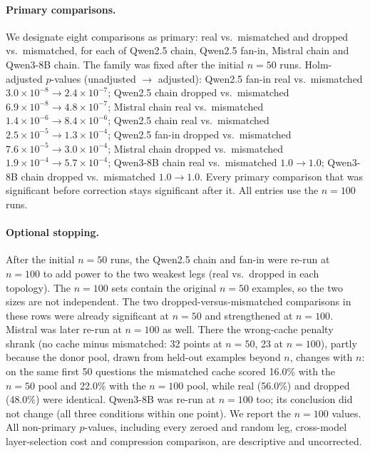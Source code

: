 \documentclass[11pt]{article}
\begin{document}
\paragraph{Primary comparisons.} We designate eight comparisons as primary:
real vs.\ mismatched and dropped vs.\ mismatched, for each of Qwen2.5 chain,
Qwen2.5 fan-in, Mistral chain and Qwen3-8B chain. The family was fixed after
the initial $n{=}50$ runs. Holm-adjusted $p$-values (unadjusted $\to$
adjusted): Qwen2.5 fan-in real vs.\ mismatched $3.0\times10^{-8}\to
2.4\times10^{-7}$; Qwen2.5 chain dropped vs.\ mismatched $6.9\times10^{-8}\to
4.8\times10^{-7}$; Mistral chain real vs.\ mismatched $1.4\times10^{-6}\to
8.4\times10^{-6}$; Qwen2.5 chain real vs.\ mismatched $2.5\times10^{-5}\to
1.3\times10^{-4}$; Qwen2.5 fan-in dropped vs.\ mismatched $7.6\times10^{-5}\to
3.0\times10^{-4}$; Mistral chain dropped vs.\ mismatched $1.9\times10^{-4}\to
5.7\times10^{-4}$; Qwen3-8B chain real vs.\ mismatched $1.0\to1.0$; Qwen3-8B
chain dropped vs.\ mismatched $1.0\to1.0$. Every primary comparison that was
significant before correction stays significant after it. All entries use the
$n{=}100$ runs.

\paragraph{Optional stopping.} After the initial $n{=}50$ runs, the Qwen2.5
chain and fan-in were re-run at $n{=}100$ to add power to the two weakest legs
(real vs.\ dropped in each topology). The $n{=}100$ sets contain the original
$n{=}50$ examples, so the two sizes are not independent. The two
dropped-versus-mismatched comparisons in these rows were already significant
at $n{=}50$ and strengthened at $n{=}100$. Mistral was later re-run at $n{=}100$
as well. There the wrong-cache penalty shrank (no cache minus mismatched: 32
points at $n{=}50$, 23 at $n{=}100$), partly because the donor pool, drawn from
held-out examples beyond $n$, changes with $n$: on the same first 50 questions
the mismatched cache scored 16.0\% with the $n{=}50$ pool and 22.0\% with the
$n{=}100$ pool, while real (56.0\%) and dropped (48.0\%) were identical.
Qwen3-8B was re-run at $n{=}100$ too; its conclusion did not change (all three
conditions within one point). We report the $n{=}100$ values. All non-primary
$p$-values,
including every zeroed and random leg, cross-model layer-selection cost and
compression comparison, are descriptive and uncorrected.
\end{document}
